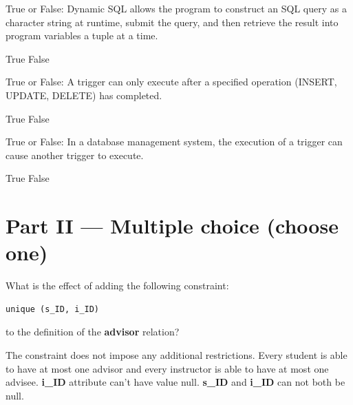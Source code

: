 \documentclass[12pt]{exam}
\begin{document}
\begin{questions}
\begin{minipage}{\linewidth}
\question[2]
True or False: Dynamic SQL allows the program to construct an SQL query as a character string at runtime, submit the query, 
and then retrieve the result into program variables a tuple at a time.\par\vspace{0.5em}
\begin{checkboxes}
    \CorrectChoice True
    \choice False
\end{checkboxes}
\end{minipage}\vspace{1em}

\begin{minipage}{\linewidth}
\question[2]
True or False: A trigger can only execute after a specified operation (INSERT, UPDATE, DELETE) has completed.\par\vspace{0.5em}
\begin{checkboxes}
    \choice True
    \CorrectChoice False
\end{checkboxes}
\end{minipage}\vspace{1em}

\begin{minipage}{\linewidth}
\question[2]
True or False: In a database management system, the execution of a trigger can cause another trigger to execute.\par\vspace{0.5em}
\begin{checkboxes}
    \CorrectChoice True
    \choice False
\end{checkboxes}
\end{minipage}\vspace{1em}
\section*{Part II — Multiple choice (choose one)}
\begin{minipage}{\linewidth}
\question[3]
What is the effect of adding the following constraint:\par
\begin{verbatim}
unique (s_ID, i_ID)
\end{verbatim}
to the definition of the \textbf{advisor} relation?\par\vspace{0.5em}
\begin{checkboxes}
    \CorrectChoice The constraint does not impose any additional restrictions.
    \choice Every student is able to have at most one advisor and every instructor is able to have at most one advisee.
    \choice \textbf{i\_ID} attribute can't have value null.
    \choice \textbf{s\_ID} and \textbf{i\_ID} can not both be null.
\end{checkboxes}
\end{minipage}\vspace{1em}


\end{questions}
\end{document}
